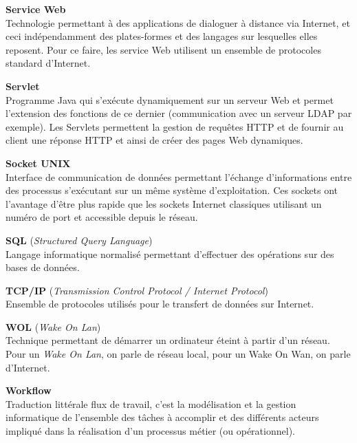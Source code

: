 \vspace{0.5cm}

\textbf{Service Web}\\
Technologie permettant \`a des applications de dialoguer \`a distance via Internet, et ceci ind\'ependamment des plates-formes et des langages sur lesquelles elles reposent.
Pour ce faire, les service Web utilisent un ensemble de protocoles standard d'Internet.

\vspace{0.5cm}

\textbf{Servlet}\\
Programme Java qui s'ex\'ecute dynamiquement sur un serveur Web et permet l'extension des fonctions de ce dernier (communication avec un serveur LDAP par exemple).
Les Servlets permettent la gestion de requ\^etes HTTP et de fournir au client une r\'eponse HTTP et ainsi de cr\'eer des pages Web dynamiques.

\vspace{0.5cm}

\textbf{Socket UNIX}\\
Interface de communication de donn\'ees permettant l'\'echange d'informations entre des processus s'ex\'ecutant sur un m\^eme syst\`eme d'exploitation.
Ces sockets ont l'avantage d'\^etre plus rapide que les sockets Internet classiques utilisant un num\'ero de port et accessible depuis le r\'eseau.

\vspace{0.5cm}

\textbf{SQL} (\textit{Structured Query Language})\\
Langage informatique normalis\'e permettant d'effectuer des op\'erations sur des bases de donn\'ees.

\vspace{0.5cm}

\textbf{TCP/IP} (\textit{Transmission Control Protocol / Internet Protocol})\\
Ensemble de protocoles utilis\'es pour le transfert de donn\'ees sur Internet.

\vspace{0.5cm}

\textbf{WOL} (\textit{Wake On Lan})\\
Technique permettant de d\'emarrer un ordinateur \'eteint \`a partir d'un r\'eseau. 
Pour un \textit{Wake On Lan}, on parle de r\'eseau local, pour un Wake On Wan, on parle d'Internet.

\vspace{0.5cm}

\textbf{Workflow}\\
Traduction litt\'erale \og{}flux de travail\fg{}, c'est la mod\'elisation et la gestion informatique de l'ensemble des t\^aches \`a accomplir et des diff\'erents acteurs impliqu\'e dans la r\'ealisation d'un processus m\'etier (ou op\'erationnel).

\clearpage
